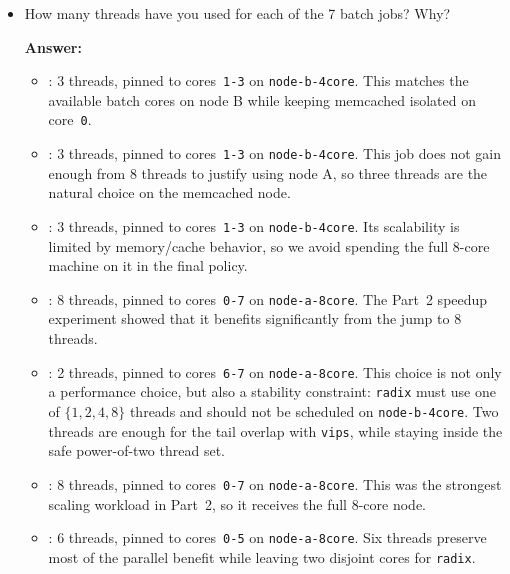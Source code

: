 \begin{enumerate}
\begin{enumerate}
\begin{itemize}
        \item How many threads have you used for each of the 7 batch jobs? Why?
    
        \textbf{Answer:}
    
        \begin{itemize}
            \item {}: 3 threads, pinned to
            cores~\texttt{1-3} on \texttt{node-b-4core}. This matches the
            available batch cores on node B while keeping memcached isolated on
            core~\texttt{0}.
            
            \item {}: 3 threads, pinned to
            cores~\texttt{1-3} on \texttt{node-b-4core}. This job does not gain
            enough from 8 threads to justify using node A, so three threads are
            the natural choice on the memcached node.
            
            \item {}: 3 threads, pinned to
            cores~\texttt{1-3} on \texttt{node-b-4core}. Its scalability is
            limited by memory/cache behavior, so we avoid spending the full
            8-core machine on it in the final policy.
            
            \item {}: 8 threads, pinned to
            cores~\texttt{0-7} on \texttt{node-a-8core}. The Part~2 speedup
            experiment showed that it benefits significantly from the jump to 8
            threads.
            
            \item {}: 2 threads, pinned to
            cores~\texttt{6-7} on \texttt{node-a-8core}. This choice is not
            only a performance choice, but also a stability constraint:
            \texttt{radix} must use one of \(\{1,2,4,8\}\) threads and should
            not be scheduled on \texttt{node-b-4core}. Two threads are enough
            for the tail overlap with \texttt{vips}, while staying inside the
            safe power-of-two thread set.
           
            \item {}: 8 threads, pinned to
            cores~\texttt{0-7} on \texttt{node-a-8core}. This was the strongest
            scaling workload in Part~2, so it receives the full 8-core node.
            
            \item {}: 6 threads, pinned to
            cores~\texttt{0-5} on \texttt{node-a-8core}. Six threads preserve
            most of the parallel benefit while leaving two disjoint cores for
            \texttt{radix}.
            \\
        \end{itemize}


\end{itemize}
\end{enumerate}
\end{enumerate}
